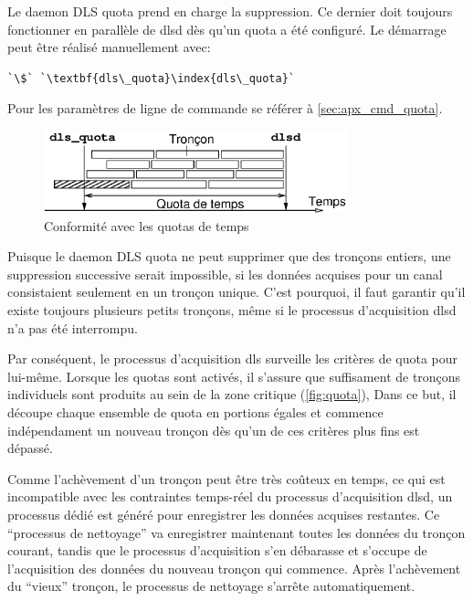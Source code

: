 \documentclass[a4paper,12pt,BCOR6mm,bibtotoc,idxtotoc]{scrbook}
\begin{document}
Le daemon DLS quota prend en charge la suppression. Ce
dernier doit toujours fonctionner en parall\`ele de dlsd d\`es qu'un
quota a \'et\'e configur\'e.  Le d\'emarrage peut \^etre r\'ealis\'e
manuellement avec:

\begin{lstlisting}
`\$` `\textbf{dls\_quota}\index{dls\_quota}`
\end{lstlisting}

Pour les param\`etres de ligne de commande se r\'ef\'erer \`a
\autoref{sec:apx_cmd_quota}.

\begin{figure}[htb]
 \begin{center}
  \includegraphics[width=250pt]{bilder/quota_fr}
 \end{center}
 \caption{Conformit\'e avec les quotas de temps}
 \label{fig:quota}
\end{figure}

Puisque le daemon DLS quota ne peut supprimer que des tron\c cons entiers,
une suppression successive serait impossible, si les donn\'ees acquises
pour un canal consistaient seulement en un tron\c con unique.
C'est pourquoi, il faut garantir qu'il existe toujours plusieurs petits tron\c cons,
m\^eme si le processus d'acquisition dlsd n'a pas \'et\'e interrompu.

Par cons\'equent, le processus d'acquisition dls surveille les
crit\`eres de quota pour lui-m\^eme.  Lorsque les quotas sont
activ\'es, il s'assure que suffisament de tron\c cons individuels sont
produits au sein de la zone critique (\autoref{fig:quota}), Dans ce
but, il d\'ecoupe chaque ensemble de quota en portions \'egales et
commence ind\'ependament un nouveau tron\c con d\`es qu'un de ces
crit\`eres plus fins est d\'epass\'e.

Comme l'ach\`evement d'un tron\c con peut \^etre tr\`es
co\^uteux en temps, ce qui est incompatible avec les contraintes
temps-r\'eel du processus d'acquisition dlsd, un processus d\'edi\'e
est g\'en\'er\'e pour enregistrer les donn\'ees acquises restantes. Ce
``processus de nettoyage'' va enregistrer
maintenant toutes les donn\'ees du tron\c con courant, tandis que le
processus d'acquisition s'en d\'ebarasse et s'occupe de l'acquisition
des donn\'ees du nouveau tron\c con qui commence.  Apr\`es
l'ach\`evement du ``vieux'' tron\c con, le processus de nettoyage
s'arr\^ete automatiquement.
\end{document}
